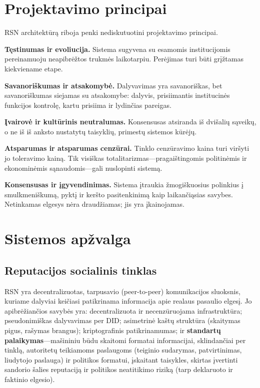 \documentclass[11pt,a4paper,twocolumn]{article}
\begin{document}
\section{Projektavimo principai}

RSN architektūrą riboja penki nediskutuotini projektavimo principai.

\textbf{Tęstinumas ir evoliucija.} Sistema sugyvena su esamomis institucijomis pereinamuoju neapibrėžtos trukmės laikotarpiu. Perėjimas turi būti grįžtamas kiekviename etape.

\textbf{Savanoriškumas ir atsakomybė.} Dalyvavimas yra savanoriškas, bet savanoriškumas siejamas su atsakomybe: dalyvis, prisiimantis institucinės funkcijos kontrolę, kartu prisiima ir lydinčias pareigas.

\textbf{Įvairovė ir kultūrinis neutralumas.} Konsensusas atsiranda iš dvišalių sąveikų, o ne iš iš anksto nustatytų taisyklių, primestų sistemos kūrėjų.

\textbf{Atsparumas ir atsparumas cenzūrai.} Tinklo cenzūravimo kaina turi viršyti jo toleravimo kainą. Tik visiškas totalitarizmas---pragaištingomis politinėmis ir ekonominėmis sąnaudomis---gali nuslopinti sistemą.

\textbf{Konsensusas ir įgyvendinimas.} Sistema įtraukia žmogiškuosius polinkius į smulkmeniškumą, pyktį ir keršto pasitenkinimą kaip laikančiąsias savybes. Netinkamas elgesys nėra draudžiamas; jis yra įkainojamas.

\section{Sistemos apžvalga}

\subsection{Reputacijos socialinis tinklas}

RSN yra decentralizuotas, tarpusavio (peer-to-peer) komunikacijos sluoksnis, kuriame dalyviai keičiasi patikrinama informacija apie realaus pasaulio elgesį. Jo apibrėžiančios savybės yra: decentralizuota ir necenzūruojama infrastruktūra; pseudonimiškas dalyvavimas per DID; asimetrinė kaštų struktūra (skaitymas pigus, rašymas brangus); kriptografinis patikrinamumas; ir \textbf{standartų palaikymas}---mašininiu būdu skaitomi formatai informacijai, sklindančiai per tinklą, autoritetų teikiamoms paslaugoms (teiginio sudarymas, patvirtinimas, liudytojo paslauga) ir politikos formatui, įskaitant taisykles, skirtas įvertinti sandorio šalies reputaciją ir politikos neatitikimo riziką (tarp deklaruoto ir faktinio elgesio).
\end{document}
